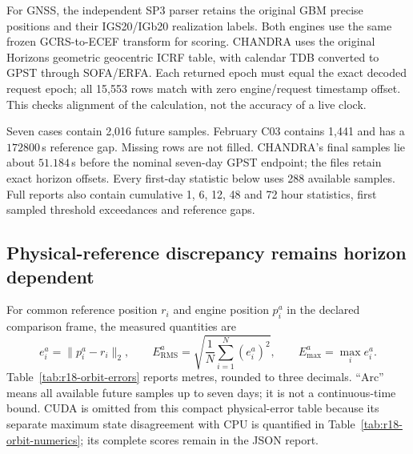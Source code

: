 For GNSS, the independent SP3 parser retains the original GBM precise positions
and their IGS20/IGb20 realization labels. Both engines use the same frozen
GCRS-to-ECEF transform for scoring. CHANDRA uses the original Horizons
geometric geocentric ICRF table, with calendar TDB converted to GPST through
SOFA/ERFA. Each returned epoch must equal the exact decoded request epoch;
all 15,553 rows match with zero engine/request timestamp offset. This checks
alignment of the calculation, not the accuracy of a live clock.

Seven cases contain 2,016 future samples. February C03 contains 1,441 and has
a $172800$\,s reference gap. Missing rows are not filled. CHANDRA's final
samples lie about $51.184$\,s before the nominal seven-day GPST endpoint;
the files retain exact horizon offsets. Every first-day statistic below uses
288 available samples. Full reports also contain cumulative 1, 6, 12, 48 and
72 hour statistics, first sampled threshold exceedances and reference gaps.

\subsection{Physical-reference discrepancy remains horizon dependent}
For common reference position $r_i$ and engine position $p_i^a$ in the declared
comparison frame, the measured quantities are
\begin{equation}
 e_i^a=\lVert p_i^a-r_i\rVert_2,\qquad
 E_{\mathrm{RMS}}^a=\sqrt{\frac{1}{N}\sum_{i=1}^{N}(e_i^a)^2},\qquad
 E_{\max}^a=\max_i e_i^a.
\end{equation}
Table~\ref{tab:r18-orbit-errors} reports metres, rounded to three decimals.
``Arc'' means all available future samples up to seven days; it is not a
continuous-time bound. CUDA is omitted from this compact physical-error table
because its separate maximum state disagreement with CPU is quantified in
Table~\ref{tab:r18-orbit-numerics}; its complete scores remain in the JSON report.

